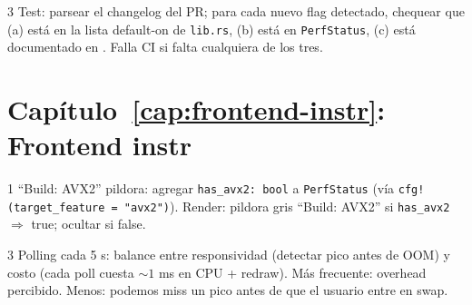 \begin{solucion}{3}
Test: parsear el changelog del PR; para cada nuevo flag detectado,
chequear que (a) está en la lista default-on de \texttt{lib.rs}, (b)
está en \texttt{PerfStatus}, (c) está documentado en
. Falla CI si falta cualquiera de los
tres.
\end{solucion}

\section*{Capítulo~\ref{cap:frontend-instr}: Frontend instr}

\begin{solucion}{1}
``Build: AVX2'' pildora: agregar \texttt{has\_avx2: bool} a
\texttt{PerfStatus} (vía \texttt{cfg!(target\_feature = "avx2")}).
Render: pildora gris ``Build: AVX2'' si \texttt{has\_avx2}
$\Rightarrow$ true; ocultar si false.
\end{solucion}

\begin{solucion}{3}
Polling cada 5 s: balance entre responsividad
(detectar pico antes de OOM) y costo (cada poll cuesta \(\sim 1\)
ms en CPU + redraw). Más frecuente: overhead percibido. Menos:
podemos miss un pico antes de que el usuario entre en swap.
\end{solucion}

\cleardoublepage
